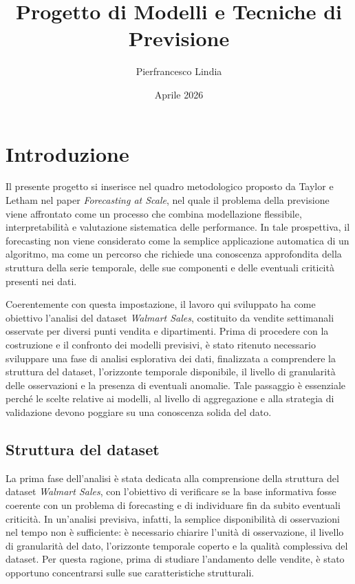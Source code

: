 \documentclass[a4paper,12pt]{article}
\title{Progetto di Modelli e Tecniche di Previsione}
\author{Pierfrancesco Lindia}
\date{Aprile 2026}
\begin{document}
\maketitle
\tableofcontents
\newpage

\section{Introduzione}

Il presente progetto si inserisce nel quadro metodologico proposto da Taylor e Letham nel paper \textit{Forecasting at Scale}, nel quale il problema della previsione viene affrontato come un processo che combina modellazione flessibile, interpretabilità e valutazione sistematica delle performance. In tale prospettiva, il forecasting non viene considerato come la semplice applicazione automatica di un algoritmo, ma come un percorso che richiede una conoscenza approfondita della struttura della serie temporale, delle sue componenti e delle eventuali criticità presenti nei dati.

Coerentemente con questa impostazione, il lavoro qui sviluppato ha come obiettivo l’analisi del dataset \textit{Walmart Sales}, costituito da vendite settimanali osservate per diversi punti vendita e dipartimenti. Prima di procedere con la costruzione e il confronto dei modelli previsivi, è stato ritenuto necessario sviluppare una fase di analisi esplorativa dei dati, finalizzata a comprendere la struttura del dataset, l’orizzonte temporale disponibile, il livello di granularità delle osservazioni e la presenza di eventuali anomalie. Tale passaggio è essenziale perché le scelte relative ai modelli, al livello di aggregazione e alla strategia di validazione devono poggiare su una conoscenza solida del dato.

\subsection{Struttura del dataset}

La prima fase dell’analisi è stata dedicata alla comprensione della struttura del dataset \textit{Walmart Sales}, con l’obiettivo di verificare se la base informativa fosse coerente con un problema di forecasting e di individuare fin da subito eventuali criticità. In un’analisi previsiva, infatti, la semplice disponibilità di osservazioni nel tempo non è sufficiente: è necessario chiarire l’unità di osservazione, il livello di granularità del dato, l’orizzonte temporale coperto e la qualità complessiva del dataset. Per questa ragione, prima di studiare l’andamento delle vendite, è stato opportuno concentrarsi sulle sue caratteristiche strutturali.
\end{document}
